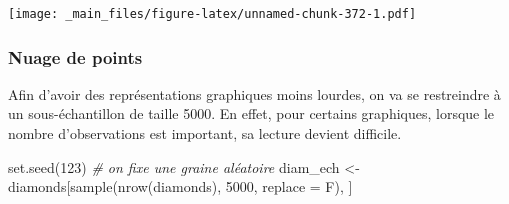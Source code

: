\documentclass[
]{book}
\newenvironment{Shaded}{\begin{snugshade}}{\end{snugshade}}
\newcommand{\AttributeTok}[1]{\textcolor[rgb]{0.77,0.63,0.00}{#1}}
\newcommand{\CommentTok}[1]{\textcolor[rgb]{0.56,0.35,0.01}{\textit{#1}}}
\newcommand{\DecValTok}[1]{\textcolor[rgb]{0.00,0.00,0.81}{#1}}
\newcommand{\FloatTok}[1]{\textcolor[rgb]{0.00,0.00,0.81}{#1}}
\newcommand{\FunctionTok}[1]{\textcolor[rgb]{0.00,0.00,0.00}{#1}}
\newcommand{\NormalTok}[1]{#1}
\newcommand{\OtherTok}[1]{\textcolor[rgb]{0.56,0.35,0.01}{#1}}
\newcommand{\SpecialCharTok}[1]{\textcolor[rgb]{0.00,0.00,0.00}{#1}}
\newcommand{\StringTok}[1]{\textcolor[rgb]{0.31,0.60,0.02}{#1}}
\theoremstyle{definition}
\theoremstyle{definition}
\theoremstyle{definition}
\theoremstyle{definition}
\theoremstyle{remark}
\begin{document}
\begin{Shaded}
\end{Shaded}

\texttt{[image: \_main\_files/figure-latex/unnamed-chunk-372-1.pdf]}

\hypertarget{nuage-de-points}{%
\subsubsection{Nuage de points}\label{nuage-de-points}}

Afin d'avoir des représentations graphiques moins lourdes, on va se restreindre à un sous-échantillon de taille 5000. En effet, pour certains graphiques, lorsque le nombre d'observations est important, sa lecture devient difficile.

\begin{Shaded}
\begin{Highlighting}[]
\FunctionTok{set.seed}\NormalTok{(}\DecValTok{123}\NormalTok{) }\CommentTok{\# on fixe une graine aléatoire }
\NormalTok{diam\_ech }\OtherTok{\textless{}{-}}\NormalTok{ diamonds[}\FunctionTok{sample}\NormalTok{(}\FunctionTok{nrow}\NormalTok{(diamonds), }\DecValTok{5000}\NormalTok{, }\AttributeTok{replace =}\NormalTok{ F), ]  }
\end{Highlighting}
\end{Shaded}
\end{document}

